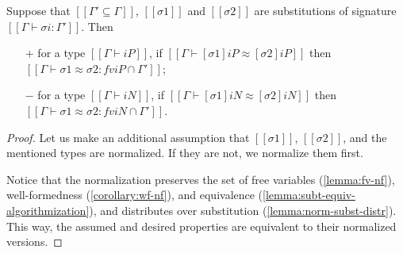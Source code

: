 \begin{lemma}[]
  Suppose that $[[{Γ'} ⊆ {Γ}]]$,
  $[[σ1]]$ and $[[σ2]]$ are substitutions of signature $[[Γ ⊢ σi : Γ']]$.
  Then 
  \begin{enumerate}
    \item [$+$] for a type $[[Γ ⊢ iP]]$, if $[[Γ ⊢ [σ1]iP ≈ [σ2]iP]]$ then 
    $[[Γ ⊢ σ1 ≈ σ2 : fv iP ∩ {Γ'}]]$;
    \item [$-$] for a type $[[Γ ⊢ iN]]$, if $[[Γ ⊢ [σ1]iN ≈ [σ2]iN]]$ then
    $[[Γ ⊢ σ1 ≈ σ2 : fv iN ∩ {Γ'}]]$.
  \end{enumerate}
\end{lemma}
\begin{proof}
  Let us make an additional assumption that $[[σ1]]$, $[[σ2]]$, 
  and the mentioned types are normalized. If they are not,
  we normalize them first.
  
  Notice that the normalization preserves
  the set of free variables (\cref{lemma:fv-nf}),
  well-formedness (\cref{corollary:wf-nf}), 
  and equivalence (\cref{lemma:subt-equiv-algorithmization}), 
  and distributes over substitution (\cref{lemma:norm-subst-distr}). 
  This way, the assumed and desired properties are equivalent to their 
  normalized versions.


\end{proof}
